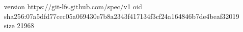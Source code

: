 version https://git-lfs.github.com/spec/v1
oid sha256:07a5dfd77cec05a069430e7b8a2343f417134f3cf24a164846b7de4beaf32019
size 21968
